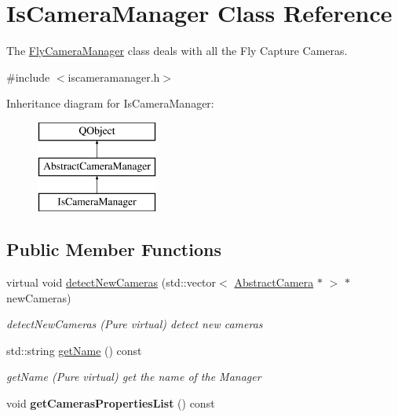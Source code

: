 \hypertarget{class_is_camera_manager}{\section{Is\-Camera\-Manager Class Reference}
\label{class_is_camera_manager}
}


The \hyperlink{class_fly_camera_manager}{Fly\-Camera\-Manager} class deals with all the Fly Capture Cameras.  




{\ttfamily \#include $<$iscameramanager.\-h$>$}

Inheritance diagram for Is\-Camera\-Manager\-:\begin{figure}[H]
\begin{center}
\leavevmode
\includegraphics[height=3.000000cm]{class_is_camera_manager}
\end{center}
\end{figure}
\subsection*{Public Member Functions}
\begin{DoxyCompactItemize}
\item 
virtual void \hyperlink{class_is_camera_manager_a4b65e770537668dffca47cbf6af34dfb}{detect\-New\-Cameras} (std\-::vector$<$ \hyperlink{class_abstract_camera}{Abstract\-Camera} $\ast$ $>$ $\ast$new\-Cameras)
\begin{DoxyCompactList}\small\item\em detect\-New\-Cameras (Pure virtual) detect new cameras \end{DoxyCompactList}\item 
std\-::string \hyperlink{class_is_camera_manager_a86228372c8903914acc3764e9358163b}{get\-Name} () const 
\begin{DoxyCompactList}\small\item\em get\-Name (Pure virtual) get the name of the Manager \end{DoxyCompactList}\item 
\hypertarget{class_is_camera_manager_a505c0eef8802a84ecc777112d4fcdc32}{void {\bfseries get\-Cameras\-Properties\-List} () const }\label{class_is_camera_manager_a505c0eef8802a84ecc777112d4fcdc32}

\end{DoxyCompactItemize}
